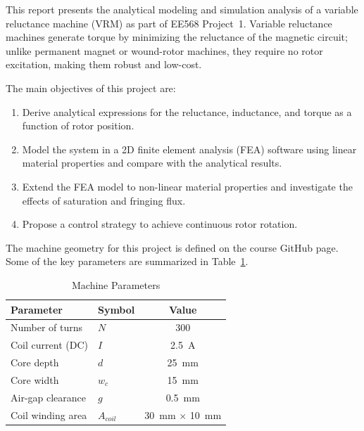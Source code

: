 \documentclass[12pt, a4paper]{article}
\begin{document}
This report presents the analytical modeling and simulation analysis of a variable reluctance machine (VRM) as part of EE568 Project~1. Variable reluctance machines generate torque by minimizing the reluctance of the magnetic circuit; unlike permanent magnet or wound-rotor machines, they require no rotor excitation, making them robust and low-cost.

The main objectives of this project are:
\begin{enumerate}[leftmargin=*, label=\arabic*.]
    \item Derive analytical expressions for the reluctance, inductance, and torque as a function of rotor position.
    \item Model the system in a 2D finite element analysis (FEA) software using linear material properties and compare with the analytical results.
    \item Extend the FEA model to non-linear material properties and investigate the effects of saturation and fringing flux.
    \item Propose a control strategy to achieve continuous rotor rotation.
\end{enumerate}

The machine geometry for this project is defined on the course GitHub page. Some of the key parameters are summarized in Table~\ref{tab:params}.

\begin{table}[htbp]
    \centering
    \caption{Machine Parameters}
    \label{tab:params}
    \begin{tabular}{llc}
        \toprule
        \textbf{Parameter} & \textbf{Symbol} & \textbf{Value} \\
        \midrule
        Number of turns          & $N$         & 300 \\
        Coil current (DC)        & $I$         & \SI{2.5}{A} \\
        Core depth               & $d$         & \SI{25}{mm} \\
        Core width               & $w_c$       & \SI{15}{mm} \\
        Air-gap clearance        & $g$         & \SI{0.5}{mm} \\
        Coil winding area        & $A_{coil}$  & \SI{30}{mm} $\times$ \SI{10}{mm} \\
        \bottomrule
    \end{tabular}
\end{table}
\end{document}
